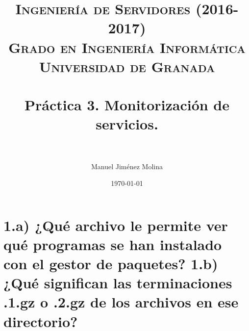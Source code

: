 
\title{	
	\normalfont \normalsize 
	\textsc{{\bf Ingeniería de Servidores (2016-2017)} \\ Grado en Ingeniería Informática \\ Universidad de Granada} \\ [25pt] %
	\horrule{0.5pt} \\[0.4cm] %
	\huge Práctica 3. Monitorización de servicios. \\ %
	\horrule{2pt} \\[0.5cm] %
}

\author{Manuel Jiménez Molina} %

\date{\normalsize\today} %



	
	\maketitle %
	
	\newpage %
	
	\tableofcontents %
	
	\listoffigures
	
	\listoftables
	
	\newpage
	
	
	
	
	
	\newpage
	
	
	\section{1.a) ¿Qué archivo le permite ver qué programas se han instalado con el gestor de paquetes? 1.b) ¿Qué significan las terminaciones .1.gz o .2.gz de los archivos en ese directorio?}
	
